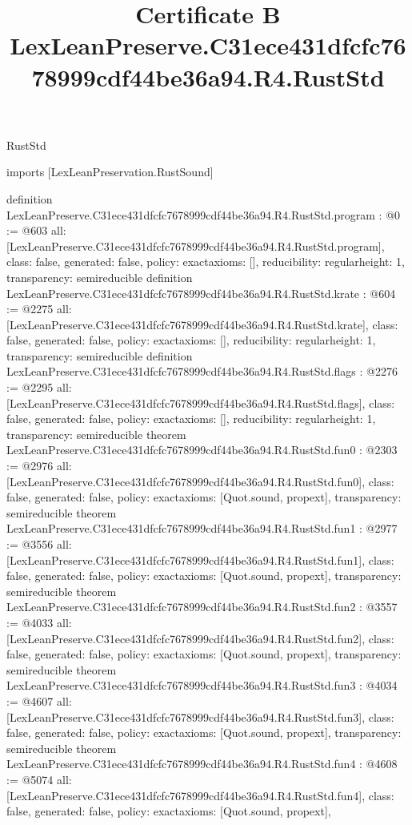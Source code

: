 \begin{lexlean}{RustStd}
\title{Certificate B LexLeanPreserve.C31ece431dfcfc7678999cdf44be36a94.R4.RustStd}
\begin{coremodule}
imports [LexLeanPreservation.RustSound]

definition LexLeanPreserve.C31ece431dfcfc7678999cdf44be36a94.R4.RustStd.program : @0 := @603 {
  all: [LexLeanPreserve.C31ece431dfcfc7678999cdf44be36a94.R4.RustStd.program],
  class: false,
  generated: false,
  policy: exact{axioms: []},
  reducibility: regular{height: 1},
  transparency: semireducible
}
definition LexLeanPreserve.C31ece431dfcfc7678999cdf44be36a94.R4.RustStd.krate : @604 := @2275 {
  all: [LexLeanPreserve.C31ece431dfcfc7678999cdf44be36a94.R4.RustStd.krate],
  class: false,
  generated: false,
  policy: exact{axioms: []},
  reducibility: regular{height: 1},
  transparency: semireducible
}
definition LexLeanPreserve.C31ece431dfcfc7678999cdf44be36a94.R4.RustStd.flags : @2276 := @2295 {
  all: [LexLeanPreserve.C31ece431dfcfc7678999cdf44be36a94.R4.RustStd.flags],
  class: false,
  generated: false,
  policy: exact{axioms: []},
  reducibility: regular{height: 1},
  transparency: semireducible
}
theorem LexLeanPreserve.C31ece431dfcfc7678999cdf44be36a94.R4.RustStd.fun0 : @2303 := @2976 {
  all: [LexLeanPreserve.C31ece431dfcfc7678999cdf44be36a94.R4.RustStd.fun0],
  class: false,
  generated: false,
  policy: exact{axioms: [Quot.sound, propext]},
  transparency: semireducible
}
theorem LexLeanPreserve.C31ece431dfcfc7678999cdf44be36a94.R4.RustStd.fun1 : @2977 := @3556 {
  all: [LexLeanPreserve.C31ece431dfcfc7678999cdf44be36a94.R4.RustStd.fun1],
  class: false,
  generated: false,
  policy: exact{axioms: [Quot.sound, propext]},
  transparency: semireducible
}
theorem LexLeanPreserve.C31ece431dfcfc7678999cdf44be36a94.R4.RustStd.fun2 : @3557 := @4033 {
  all: [LexLeanPreserve.C31ece431dfcfc7678999cdf44be36a94.R4.RustStd.fun2],
  class: false,
  generated: false,
  policy: exact{axioms: [Quot.sound, propext]},
  transparency: semireducible
}
theorem LexLeanPreserve.C31ece431dfcfc7678999cdf44be36a94.R4.RustStd.fun3 : @4034 := @4607 {
  all: [LexLeanPreserve.C31ece431dfcfc7678999cdf44be36a94.R4.RustStd.fun3],
  class: false,
  generated: false,
  policy: exact{axioms: [Quot.sound, propext]},
  transparency: semireducible
}
theorem LexLeanPreserve.C31ece431dfcfc7678999cdf44be36a94.R4.RustStd.fun4 : @4608 := @5074 {
  all: [LexLeanPreserve.C31ece431dfcfc7678999cdf44be36a94.R4.RustStd.fun4],
  class: false,
  generated: false,
  policy: exact{axioms: [Quot.sound, propext]},
}
\end{coremodule}
\end{lexlean}
